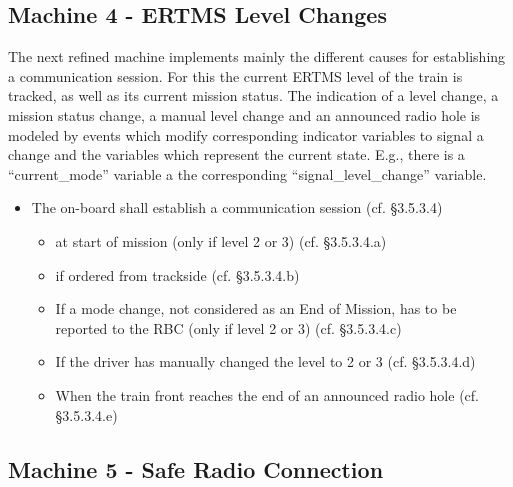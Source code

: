 \documentclass[10pt,a4paper]{article}
\begin{document}



\subsection{Machine 4 - ERTMS Level Changes}
\label{sec:machine-4-ertms}

The next refined machine implements mainly the different causes for establishing
a communication session. For this the current ERTMS level of the train is
tracked, as well as its current mission status. The indication of a level
change, a mission status change, a manual level change and an announced radio
hole is modeled by events which modify corresponding indicator variables to
signal a change and the variables which represent the current state. E.g., there
is a ``current\_mode'' variable a the corresponding ``signal\_level\_change''
variable.

\begin{itemize}
\item The on-board shall establish a communication session (cf. §3.5.3.4)
  \begin{itemize}
  \item at start of mission (only if level 2 or 3) (cf. §3.5.3.4.a)
  \item if ordered from trackside (cf. §3.5.3.4.b)
  \item If a mode change, not considered as an End of Mission, has to be
    reported to the RBC (only if level 2 or 3) (cf. §3.5.3.4.c)
  \item If the driver has manually changed the level to 2 or 3 (cf. §3.5.3.4.d)
  \item When the train front reaches the end of an announced radio hole
    (cf. §3.5.3.4.e)
  \end{itemize}
\end{itemize}



\subsection{Machine 5 - Safe Radio Connection}
\label{sec:machine-5-safe}


\end{document}
